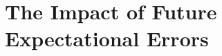 \documentclass{beamer}
\begin{document}
%      
      \section{The Impact of Future Expectational Errors}
\end{document}
